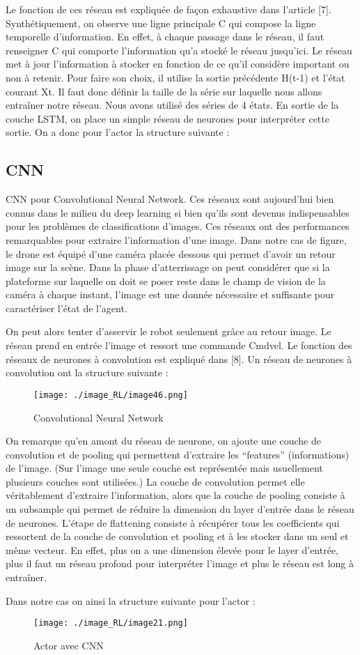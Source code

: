 Le fonction de ces réseau est expliquée de façon exhaustive dans l’article [7].
Synthétiquement, on observe une ligne principale C qui compose la ligne temporelle d’information. En effet, à chaque passage dans le réseau, il faut renseigner C qui comporte l’information qu'a stocké le réseau jusqu’ici. Le réseau met à jour l’information à stocker en fonction de ce qu'il considère important ou non à retenir. Pour faire son choix, il utilise la sortie précédente H(t-1) et l’état courant Xt.
Il faut donc définir la taille de la série sur laquelle nous allons entraîner notre réseau. Nous avons utilisé des séries de 4 états.
En sortie de la couche LSTM, on place un simple réseau de neurones pour interpréter cette sortie.
On a donc pour l’actor la structure suivante :

\subsection{CNN}

CNN pour Convolutional Neural Network. Ces réseaux sont aujourd’hui bien connus dans le milieu du deep learning si bien qu'ils sont devenus indispensables pour les problèmes de classifications d’images.
Ces réseaux ont des performances remarquables pour extraire l’information d’une image.
Dans notre cas de figure, le drone est équipé d’une caméra placée dessous qui permet d’avoir un retour image sur la scène.
Dans la phase d'atterrissage on peut considérer que si la plateforme sur laquelle on doit se poser reste dans le champ de vision de la caméra à chaque instant, l’image est une donnée nécessaire et suffisante pour caractériser l’état de l’agent.

On peut alors tenter d’asservir le robot seulement grâce au retour image.
Le réseau prend en entrée l’image et ressort une commande Cmdvel.
Le fonction des réseaux de neurones à convolution est expliqué dans [8].
Un réseau de neurones à convolution ont la structure suivante :
\begin{figure}[H]
    \centering
    \texttt{[image: ./image\_RL/image46.png]}
    \caption{Convolutional Neural Network  }
\end{figure}

On remarque qu’en amont du réseau de neurone, on ajoute une couche de convolution et de pooling qui permettent d’extraire les “features” (informations) de l’image. 
(Sur l’image une seule couche est représentée mais usuellement plusieurs couches sont utilisées.)
La couche de convolution permet elle véritablement d’extraire l’information, alors que la couche de pooling consiste à un subsample qui permet de réduire la dimension du layer d’entrée dans le réseau de neurones.
L’étape de flattening consiste à récupérer tous les coefficients qui ressortent de la couche de convolution et pooling et à les stocker dans un seul et même vecteur.
En effet, plus on a une dimension élevée pour le layer d'entrée, plus il faut un réseau profond pour interpréter l’image et plus le réseau est long à entraîner.

Dans notre cas on ainsi la structure suivante pour l’actor :

\begin{figure}[H]
    \centering
    \texttt{[image: ./image\_RL/image21.png]}
    \caption{ Actor avec CNN }
\end{figure}